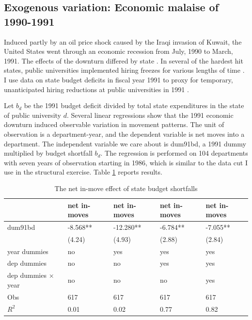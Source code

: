 \documentclass[]{article}
\begin{document}
\subsection{Exogenous variation: Economic malaise of 1990-1991}

Induced partly by an oil price shock caused by the Iraqi invasion of
Kuwait, the United States went through an economic recession from July,
1990 to March, 1991. The effects of the downturn differed by state
\citep{wapo1991public, moore1991state}. In several of the hardest hit
states, public universities implemented hiring freezes for various
lengths of time
\citep{latimes1991golden, moneymag1991paying, uvermont2013presidential}.
I use data on state budget deficits in fiscal year 1991 to proxy for
temporary, unanticipated hiring reductions at public universities in
1991 \citep{gold1995fiscal}.

 Let $b_d$ be the 1991 budget deficit
divided by total state expenditures in the state of public university
$d$.   Several linear regressions show that the 1991 economic downturn induced observable variation
in movement patterns.  The unit of observation is a department-year, and the dependent variable
 is net moves into a department.  The independent variable we care about is dum91bd, a 1991
dummy multiplied by budget shortfall $b_d$. The regression is performed
on 104 departments with seven years of observation starting in 1986, which
is similar to the data cut I use in the structural exercise.
 Table \ref{tab:bd_reg} reports results.

\begin{table}[h]
    \centering
    \begin{tabular}{|l|l|l|l|l|}
        \hline
                            & net in-moves &   net in-moves &     net in-moves &    net in-moves \\   \hline
dum91bd                     &     -8.568** &     -12.280**  &      -6.784**    &      -7.055**   \\
                            &      (4.24)  &      (4.93)    &      (2.88)      &      (2.84)     \\
year dummies                &        no    &         yes    &          yes     &         yes     \\
dep dummies                 &        no    &         no     &          yes     &         yes     \\
dep dummies $\times$ year   & no           &  no            &   no             &  yes            \\  \hline
Obs                         & 617          &  617           &   617            &  617            \\
$R^2$                       & 0.01         &  0.02          &   0.77           &  0.82           \\  \hline
    \end{tabular}
    \caption{The net in-move effect of state budget shortfalls}
    \label{tab:bd_reg}
\end{table}
\end{document}
